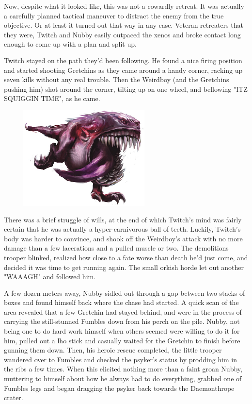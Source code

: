 Now, despite what it looked like, this was not a cowardly retreat. 
It was actually a carefully planned tactical maneuver to distract the enemy from the true objective. 
Or at least it turned out that way in any case. 
Veteran retreaters that they were, Twitch and Nubby easily outpaced the xenos and broke contact long enough to come up with a plan and split up. 


Twitch stayed on the path they'd been following. 
He found a nice firing position and started shooting Gretchins as they came around a handy corner, racking up seven kills without any real trouble. 
Then the Weirdboy (and the Gretchins pushing him) shot around the corner, tilting up on one wheel, and bellowing "ITZ SQUIGGIN TIME", as he came. 


\begin{figure}
	\begin{center}
		\includegraphics[width=\figwidth]{pics/16/33.png}
	\end{center}
\end{figure}
There was a brief struggle of wills, at the end of which Twitch's mind was fairly certain that he was actually a hyper-carnivorous ball of teeth. 
Luckily, Twitch's body was harder to convince, and shook off the Weirdboy's attack with no more damage than a few lacerations and a pulled muscle or two. 
The demolitions trooper blinked, realized how close to a fate worse than death he'd just come, and decided it was time to get running again. 
The small orkish horde let out another "WAAAGH" and followed him.

A few dozen meters away, Nubby sidled out through a gap between two stacks of boxes and found himself back where the chase had started. 
A quick scan of the area revealed that a few Gretchin had stayed behind, and were in the process of carrying the still-stunned Fumbles down from his perch on the pile. 
Nubby, not being one to do hard work himself when others seemed were willing to do it for him, pulled out a lho stick and casually waited for the Gretchin to finish before gunning them down. 
Then, his heroic rescue completed, the little trooper wandered over to Fumbles and checked the psyker's status by prodding him in the ribs a few times. 
When this elicited nothing more than a faint groan Nubby, muttering to himself about how he always had to do everything, grabbed one of Fumbles legs and began dragging the psyker back towards the Daemonthrope crater.

